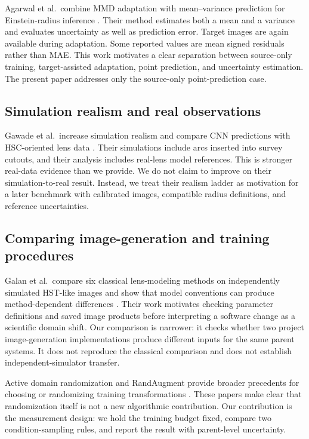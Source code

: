\documentclass[letterpaper]{article}
\begin{document}
Agarwal et al.\ combine MMD adaptation with mean--variance prediction for
Einstein-radius inference \citep{agarwal2024domain}. Their method estimates
both a mean and a variance and evaluates uncertainty as well as prediction
error. Target images are again available during adaptation. Some reported
values are mean signed residuals rather than MAE. This work motivates a clear
separation between source-only training, target-assisted adaptation, point
prediction, and uncertainty estimation. The present paper addresses only the
source-only point-prediction case.

\subsection{Simulation realism and real observations}

Gawade et al.\ increase simulation realism and compare CNN predictions with
HSC-oriented lens data \citep{gawade2025cnn}. Their simulations include arcs
inserted into survey cutouts, and their analysis includes real-lens model
references. This is stronger real-data evidence than we provide. We do not
claim to improve on their simulation-to-real result. Instead, we treat their
realism ladder as motivation for a later benchmark with calibrated images,
compatible radius definitions, and reference uncertainties.

\subsection{Comparing image-generation and training procedures}

Galan et al.\ compare six classical lens-modeling methods on independently
simulated HST-like images and show that model conventions can produce
method-dependent differences \citep{galan2024comparison}. Their work motivates
checking parameter definitions and saved image products before interpreting a
software change as a scientific domain shift. Our comparison is narrower: it
checks whether two project image-generation implementations produce different
inputs for the same parent systems. It does not reproduce the classical
comparison and does not establish independent-simulator transfer.

Active domain randomization and RandAugment provide broader precedents for
choosing or randomizing training transformations
\citep{mehta2020active,cubuk2020randaugment}. These papers make clear that
randomization itself is not a new algorithmic contribution. Our contribution is
the measurement design: we hold the training budget fixed, compare two
condition-sampling rules, and report the result with parent-level uncertainty.
\end{document}
